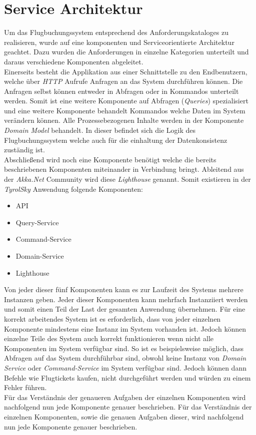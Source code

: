 \section{Service Architektur}
\label{sec:implementation:serviceAndComponentOrientation}
Um das Flugbuchungssystem entsprechend des Anforderungskataloges zu realisieren, wurde auf eine komponenten und Serviceorientierte Architektur geachtet. Dazu wurden die Anforderungen in einzelne Kategorien unterteilt und daraus verschiedene Komponenten abgeleitet. \\
Einerseits besteht die Applikation aus einer Schnittstelle zu den Endbenutzern, welche über \textit{HTTP} Aufrufe Anfragen an das System durchführen können. Die Anfragen selbst können entweder in Abfragen oder in Kommandos unterteilt werden. Somit ist eine weitere Komponente auf Abfragen (\textit{Queries}) spezialisiert und eine weitere Komponente behandelt Kommandos welche Daten im System verändern können. Alle Prozessebezogenen Inhalte werden in der Komponente \textit{Domain Model} behandelt. In dieser befindet sich die Logik des Flugbuchungssystem welche auch für die einhaltung der Datenkonsistenz zuständig ist. \\
Abschließend wird noch eine Komponente benötigt welche die bereits beschriebenen Komponenten miteinander in Verbindung bringt. Ableitend aus der \textit{Akka.Net} Community wird diese \textit{Lighthouse} genannt. Somit existieren in der \textit{TyrolSky} Anwendung folgende Komponenten:
\begin{itemize}
    \item API
    \item Query-Service
    \item Command-Service
    \item Domain-Service
    \item Lighthouse
\end{itemize}
Von jeder dieser fünf Komponenten kann es zur Laufzeit des Systems mehrere Instanzen  geben. 
Jeder dieser Komponenten kann mehrfach Instanziiert werden und somit einen Teil der Last der gesamten Anwendung übernehmen. Für eine korrekt arbeitendes System ist es erforderlich, dass von jeder einzelnen Komponente mindestens eine Instanz im System vorhanden ist. Jedoch können einzelne Teile des System auch korrekt funktionieren wenn nicht alle Komponenten im System verfügbar sind. So ist es beispielsweise möglich, dass Abfragen auf das System durchführbar sind, obwohl keine Instanz von \textit{Domain Service} oder \textit{Command-Service} im System verfügbar sind. Jedoch können dann Befehle wie Flugtickets kaufen, nicht durchgeführt werden und würden zu einem Fehler führen. \\
Für das Verständnis der genaueren Aufgaben der einzelnen Komponenten wird nachfolgend nun jede Komponente genauer beschrieben.
Für das Verständnis der einzelnen Komponenten, sowie die genauen Aufgaben dieser, wird nachfolgend nun jede Komponente genauer beschrieben.

